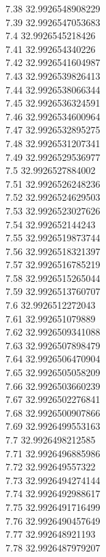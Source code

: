 {7.38	32.9926548908229\\
7.39	32.9926547053683\\
7.4	32.9926545218426\\
7.41	32.992654340226\\
7.42	32.9926541604987\\
7.43	32.9926539826413\\
7.44	32.9926538066344\\
7.45	32.9926536324591\\
7.46	32.9926534600964\\
7.47	32.9926532895275\\
7.48	32.9926531207341\\
7.49	32.9926529536977\\
7.5	32.9926527884002\\
7.51	32.9926526248236\\
7.52	32.9926524629503\\
7.53	32.9926523027626\\
7.54	32.992652144243\\
7.55	32.9926519873744\\
7.56	32.9926518321397\\
7.57	32.9926516785219\\
7.58	32.9926515265044\\
7.59	32.9926513760707\\
7.6	32.9926512272043\\
7.61	32.992651079889\\
7.62	32.9926509341088\\
7.63	32.9926507898479\\
7.64	32.9926506470904\\
7.65	32.9926505058209\\
7.66	32.9926503660239\\
7.67	32.9926502276841\\
7.68	32.9926500907866\\
7.69	32.9926499553163\\
7.7	32.9926498212585\\
7.71	32.9926496885986\\
7.72	32.992649557322\\
7.73	32.9926494274144\\
7.74	32.9926492988617\\
7.75	32.9926491716499\\
7.76	32.9926490457649\\
7.77	32.992648921193\\
7.78	32.9926487979207\\
}
